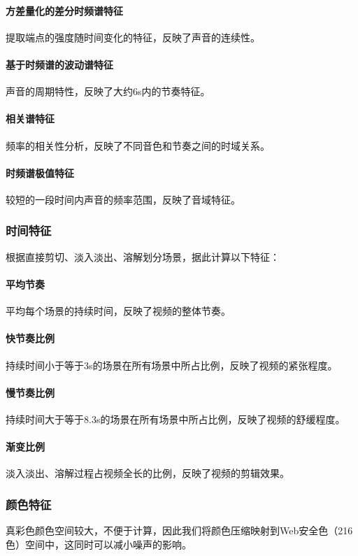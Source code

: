 \documentclass{article}
\begin{document}
\begin{multicols}{2}
                \paragraph{方差量化的差分时频谱特征}
                提取端点的强度随时间变化的特征，反映了声音的连续性。
                \paragraph{基于时频谱的波动谱特征}
                声音的周期特性，反映了大约6s内的节奏特征。
                \paragraph{相关谱特征}
                频率的相关性分析，反映了不同音色和节奏之间的时域关系。
                \paragraph{时频谱极值特征}
                较短的一段时间内声音的频率范围，反映了音域特征。

            \subsubsection{时间特征}
                根据直接剪切、淡入淡出、溶解划分场景，据此计算以下特征：
                \paragraph{平均节奏}
                平均每个场景的持续时间，反映了视频的整体节奏。
                \paragraph{快节奏比例}
                持续时间小于等于3s的场景在所有场景中所占比例，反映了视频的紧张程度。
                \paragraph{慢节奏比例}
                持续时间大于等于8.3s的场景在所有场景中所占比例，反映了视频的舒缓程度。
                \paragraph{渐变比例}
                淡入淡出、溶解过程占视频全长的比例，反映了视频的剪辑效果。

            \subsubsection{颜色特征}
                真彩色颜色空间较大，不便于计算，因此我们将颜色压缩映射到Web安全色（216色）空间中，这同时可以减小噪声的影响。


\end{multicols}
\end{document}
